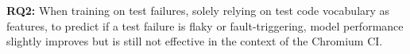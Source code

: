 


\begin{tcolorbox}[
    left=2pt,right=2pt,top=2pt,bottom=2pt, %
    arc=0pt, %
    boxrule=1.2pt %
]
\textbf{RQ2:} When training on test failures, solely relying on test code vocabulary as features, to predict if a test failure is flaky or fault-triggering, model performance slightly improves but is still not effective in the context of the Chromium CI.
\end{tcolorbox}

